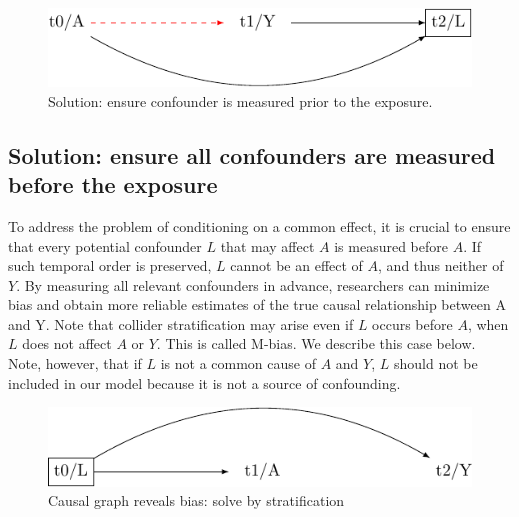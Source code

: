 \documentclass[
  singlecolumn]{report}
\begin{document}
\begin{figure}

{\centering \includegraphics[width=1\textwidth,height=\textheight]{causal-dags_files/figure-pdf/fig-dag-common-effect-1.pdf}

}

\caption{\label{fig-dag-common-effect}Solution: ensure confounder is
measured prior to the exposure.}

\end{figure}

\hypertarget{solution-ensure-all-confounders-are-measured-before-the-exposure}{%
\subsection{Solution: ensure all confounders are measured before the
exposure}\label{solution-ensure-all-confounders-are-measured-before-the-exposure}}

To address the problem of conditioning on a common effect, it is crucial
to ensure that every potential confounder \(L\) that may affect \(A\) is
measured before \(A\). If such temporal order is preserved, \(L\) cannot
be an effect of \(A\), and thus neither of \(Y\). By measuring all
relevant confounders in advance, researchers can minimize bias and
obtain more reliable estimates of the true causal relationship between A
and Y. Note that collider stratification may arise even if \(L\) occurs
before \(A\), when \(L\) does not affect \(A\) or \(Y\). This is called
M-bias. We describe this case below. Note, however, that if \(L\) is not
a common cause of \(A\) and \(Y\), \(L\) should not be included in our
model because it is not a source of confounding.

\begin{figure}

{\centering \includegraphics[width=1\textwidth,height=\textheight]{causal-dags_files/figure-pdf/fig-dag-common-effect-solution-1.pdf}

}

\caption{\label{fig-dag-common-effect-solution}Causal graph reveals
bias: solve by stratification}

\end{figure}
\end{document}
